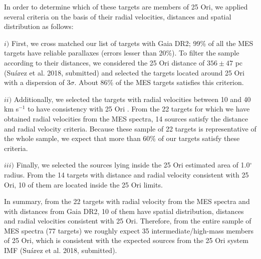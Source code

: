 \documentclass[12pt]{article}
\begin{document}
In order to determine which of these targets are members of 25 Ori, we applied several criteria on the basis of their radial velocities, distances and spatial distribution as follows:

$i)$ First, we cross matched our list of targets with Gaia DR2; 99\% of all the MES targets have reliable parallaxes (errors lesser than 20\%). To filter the sample according to their distances, we considered the 25 Ori distance of $356\pm47$ pc (Su\'arez et al. 2018, submitted) and selected the targets located around 25 Ori with a dispersion of $3\sigma$. About 86\% of the MES targets satisfies this criterion. 

$ii)$ Additionally, we selected the targets with radial velocities between 10 and 40 km s$^{-1}$ to have consistency with 25 Ori \citep{Briceno2007}. From the 22 targets for which we have obtained radial velocities from the MES spectra, 14 sources satisfy the distance and radial velocity criteria. Because these sample of 22 targets is representative of the whole sample, we expect that more than 60\% of our targets satisfy these criteria.

$iii)$ Finally, we selected the sources lying inside the 25 Ori estimated area of 1.0$^\circ$ radius. From the 14 targets with distance and radial velocity consistent with 25 Ori, 10 of them are located inside the 25 Ori limits.

In summary, from the 22 targets with radial velocity from the MES spectra and with distances from Gaia DR2, 10 of them have spatial distribution, distances and radial velocities consistent with 25 Ori. Therefore, from the entire sample of MES spectra (77 targets) we roughly expect 35 intermediate/high-mass members of 25 Ori, which is consistent with the expected sources from the 25 Ori system IMF (Su\'arez et al. 2018, submitted).
\end{document}
